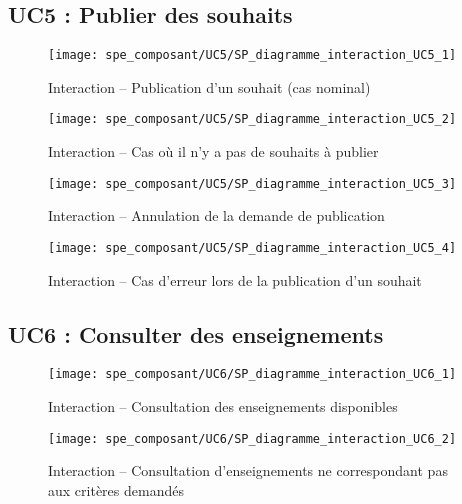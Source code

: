     \FloatBarrier
    \subsection{UC5 : Publier des souhaits}
    
    \begin{figure}[h]
    	\centering
    	\texttt{[image: spe\_composant/UC5/SP\_diagramme\_interaction\_UC5\_1]}
    	\caption{Interaction \--- Publication d'un souhait (cas nominal)}
    	\label{fig:label}
    \end{figure}
    
    \begin{figure}[h]
    	\centering
    	\texttt{[image: spe\_composant/UC5/SP\_diagramme\_interaction\_UC5\_2]}
    	\caption{Interaction \--- Cas où il n'y a pas de souhaits à publier}
    	\label{fig:label}
    \end{figure}
    
    \begin{figure}[h]
    	\centering
    	\texttt{[image: spe\_composant/UC5/SP\_diagramme\_interaction\_UC5\_3]}
    	\caption{Interaction \--- Annulation de la demande de publication}
    	\label{fig:label}
    \end{figure}
    
    \begin{figure}[h]
    	\centering
    	\texttt{[image: spe\_composant/UC5/SP\_diagramme\_interaction\_UC5\_4]}
    	\caption{Interaction \--- Cas d'erreur lors de la publication d'un souhait}
    	\label{fig:label}
    \end{figure}
    
    \FloatBarrier
    \subsection{UC6 : Consulter des enseignements}

    \begin{figure}[h]
    	\centering
    	\texttt{[image: spe\_composant/UC6/SP\_diagramme\_interaction\_UC6\_1]}
    	\caption{Interaction \--- Consultation des enseignements disponibles}
    	\label{fig:label}
    \end{figure}

     \begin{figure}[h]
    	\centering
    	\texttt{[image: spe\_composant/UC6/SP\_diagramme\_interaction\_UC6\_2]}
    	\caption{Interaction \--- Consultation d'enseignements ne correspondant pas aux critères demandés}
    	\label{fig:label}
    \end{figure}
\FloatBarrier

